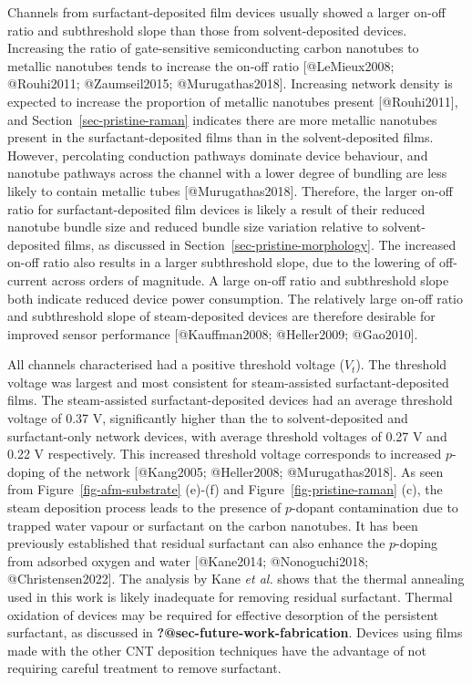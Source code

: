 \documentclass[
  letterpaper,
  DIV=11,
  numbers=noendperiod]{scrartcl}
\begin{document}
Channels from surfactant-deposited film devices usually showed a larger
on-off ratio and subthreshold slope than those from solvent-deposited
devices. Increasing the ratio of gate-sensitive semiconducting carbon
nanotubes to metallic nanotubes tends to increase the on-off ratio
{[}@LeMieux2008; @Rouhi2011; @Zaumseil2015; @Murugathas2018{]}.
Increasing network density is expected to increase the proportion of
metallic nanotubes present {[}@Rouhi2011{]}, and
Section~\ref{sec-pristine-raman} indicates there are more metallic
nanotubes present in the surfactant-deposited films than in the
solvent-deposited films. However, percolating conduction pathways
dominate device behaviour, and nanotube pathways across the channel with
a lower degree of bundling are less likely to contain metallic tubes
{[}@Murugathas2018{]}. Therefore, the larger on-off ratio for
surfactant-deposited film devices is likely a result of their reduced
nanotube bundle size and reduced bundle size variation relative to
solvent-deposited films, as discussed in
Section~\ref{sec-pristine-morphology}. The increased on-off ratio also
results in a larger subthreshold slope, due to the lowering of
off-current across orders of magnitude. A large on-off ratio and
subthreshold slope both indicate reduced device power consumption. The
relatively large on-off ratio and subthreshold slope of steam-deposited
devices are therefore desirable for improved sensor performance
{[}@Kauffman2008; @Heller2009; @Gao2010{]}.

All channels characterised had a positive threshold voltage (\(V_{t}\)).
The threshold voltage was largest and most consistent for steam-assisted
surfactant-deposited films. The steam-assisted surfactant-deposited
devices had an average threshold voltage of 0.37 V, significantly higher
than the to solvent-deposited and surfactant-only network devices, with
average threshold voltages of 0.27 V and 0.22 V respectively. This
increased threshold voltage corresponds to increased \(p\)-doping of the
network {[}@Kang2005; @Heller2008; @Murugathas2018{]}. As seen from
Figure~\ref{fig-afm-substrate} (e)-(f) and
Figure~\ref{fig-pristine-raman} (c), the steam deposition process leads
to the presence of \(p\)-dopant contamination due to trapped water
vapour or surfactant on the carbon nanotubes. It has been previously
established that residual surfactant can also enhance the \(p\)-doping
from adsorbed oxygen and water {[}@Kane2014; @Nonoguchi2018;
@Christensen2022{]}. The analysis by Kane \emph{et al.} shows that the
thermal annealing used in this work is likely inadequate for removing
residual surfactant. Thermal oxidation of devices may be required for
effective desorption of the persistent surfactant, as discussed in
\textbf{?@sec-future-work-fabrication}. Devices using films made with
the other CNT deposition techniques have the advantage of not requiring
careful treatment to remove surfactant.
\end{document}
